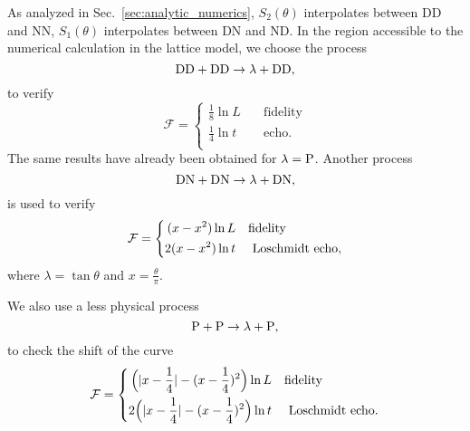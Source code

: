 As analyzed in Sec.~\ref{sec:analytic_numerics}, $S_2( \theta)$ interpolates between DD and NN, $S_1( \theta )$ interpolates between DN and ND. In the region accessible to the numerical calculation in the lattice model, we choose the process 
\begin{equation}
\label{eq:DDDD}
{\rm DD} + {\rm DD} \rightarrow  \lambda + {\rm DD},
\end{equation}
to verify
\begin{equation}
\label{eq:result_DDDD}
\mathcal{F} = 
\left\lbrace
\begin{aligned}
\frac{1}{8}\ln L  &\quad\text{fidelity}  \\
\frac{1}{4}\ln t   &\quad \text{echo} .  \\
\end{aligned} \right.  
\end{equation}
The same results have already been obtained for $\lambda = {\rm P}$\cite{stephan_logarithmic_2013,stephan_local_2011,vasseur_universal_2014,vasseur_crossover_2013,kennes_universal_2014}. Another process
\begin{equation}
\label{eq:DNDN}
{\rm DN} + {\rm DN} \rightarrow \lambda + {\rm DN} ,
\end{equation}
is used to verify
\begin{equation}
\label{eq:result_DNDN}
\mathcal{F} = 
\left\lbrace
\begin{aligned}
 (x - x^2 )\ln L   &  \quad {\rm fidelity} \\
 2(x - x^2 ) \ln t  & \quad \text{ Loschmidt echo} , \\
\end{aligned} \right. 
\end{equation}
where $\lambda = \tan \theta$ and $x = \frac{\theta}{\pi}$. 

We also use a less physical process
\begin{equation}
  \label{eq:PP}
  {\rm P} + {\rm P} \rightarrow \lambda + {\rm P},
\end{equation}
to check the shift of the curve
\begin{equation}
\label{eq:periodic-case}
\mathcal{F} = 
\left\lbrace
\begin{aligned}
  \Big(|x-\frac{1}{4}| - (x-\frac{1}{4})^2 \Big)\ln L   &  \quad {\rm fidelity} \\
  2\Big(|x-\frac{1}{4}| - (x-\frac{1}{4})^2 \Big) \ln t  & \quad \text{ Loschmidt echo} .\\
\end{aligned} \right. 
\end{equation}



